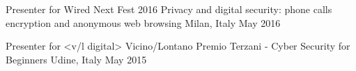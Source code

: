 \vspace{3mm}

\begin{cventries}

	\cventrynodesc
	{Presenter for Wired Next Fest 2016}
	{Privacy and digital security: phone calls encryption and anonymous web browsing \href{http://nextfest2016.wired.it/events/privacy-sicurezza-digitale-come-cifrare-telefonate-navigare-in-modo-anonimo/}{\faLink}}
	{Milan, Italy}
	{May 2016}

	\cventrynodesc
	{Presenter for <v/l digital>}
	{Vicino/Lontano Premio Terzani -  Cyber Security for Beginners \href{http://www.vicinolontano.it/eventi/workshop-cose-e-come-funziona-la-crittografia-rete/}{\faLink}}
	{Udine, Italy}
	{May 2015}

\end{cventries}
